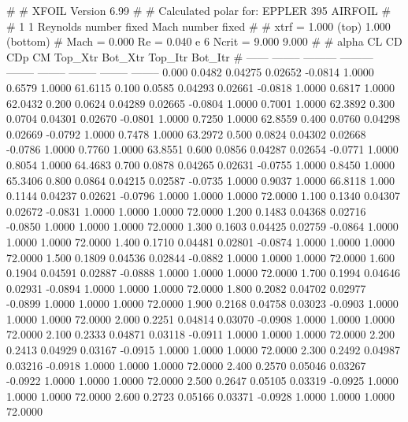#  
#       XFOIL         Version 6.99
#  
# Calculated polar for: EPPLER 395 AIRFOIL                              
#  
# 1 1 Reynolds number fixed          Mach number fixed         
#  
# xtrf =   1.000 (top)        1.000 (bottom)  
# Mach =   0.000     Re =     0.040 e 6     Ncrit =   9.000  9.000
#  
#   alpha    CL        CD       CDp       CM     Top_Xtr  Bot_Xtr  Top_Itr  Bot_Itr
#  ------ -------- --------- --------- -------- -------- -------- -------- --------
   0.000   0.0482   0.04275   0.02652  -0.0814   1.0000   0.6579   1.0000  61.6115
   0.100   0.0585   0.04293   0.02661  -0.0818   1.0000   0.6817   1.0000  62.0432
   0.200   0.0624   0.04289   0.02665  -0.0804   1.0000   0.7001   1.0000  62.3892
   0.300   0.0704   0.04301   0.02670  -0.0801   1.0000   0.7250   1.0000  62.8559
   0.400   0.0760   0.04298   0.02669  -0.0792   1.0000   0.7478   1.0000  63.2972
   0.500   0.0824   0.04302   0.02668  -0.0786   1.0000   0.7760   1.0000  63.8551
   0.600   0.0856   0.04287   0.02654  -0.0771   1.0000   0.8054   1.0000  64.4683
   0.700   0.0878   0.04265   0.02631  -0.0755   1.0000   0.8450   1.0000  65.3406
   0.800   0.0864   0.04215   0.02587  -0.0735   1.0000   0.9037   1.0000  66.8118
   1.000   0.1144   0.04237   0.02621  -0.0796   1.0000   1.0000   1.0000  72.0000
   1.100   0.1340   0.04307   0.02672  -0.0831   1.0000   1.0000   1.0000  72.0000
   1.200   0.1483   0.04368   0.02716  -0.0850   1.0000   1.0000   1.0000  72.0000
   1.300   0.1603   0.04425   0.02759  -0.0864   1.0000   1.0000   1.0000  72.0000
   1.400   0.1710   0.04481   0.02801  -0.0874   1.0000   1.0000   1.0000  72.0000
   1.500   0.1809   0.04536   0.02844  -0.0882   1.0000   1.0000   1.0000  72.0000
   1.600   0.1904   0.04591   0.02887  -0.0888   1.0000   1.0000   1.0000  72.0000
   1.700   0.1994   0.04646   0.02931  -0.0894   1.0000   1.0000   1.0000  72.0000
   1.800   0.2082   0.04702   0.02977  -0.0899   1.0000   1.0000   1.0000  72.0000
   1.900   0.2168   0.04758   0.03023  -0.0903   1.0000   1.0000   1.0000  72.0000
   2.000   0.2251   0.04814   0.03070  -0.0908   1.0000   1.0000   1.0000  72.0000
   2.100   0.2333   0.04871   0.03118  -0.0911   1.0000   1.0000   1.0000  72.0000
   2.200   0.2413   0.04929   0.03167  -0.0915   1.0000   1.0000   1.0000  72.0000
   2.300   0.2492   0.04987   0.03216  -0.0918   1.0000   1.0000   1.0000  72.0000
   2.400   0.2570   0.05046   0.03267  -0.0922   1.0000   1.0000   1.0000  72.0000
   2.500   0.2647   0.05105   0.03319  -0.0925   1.0000   1.0000   1.0000  72.0000
   2.600   0.2723   0.05166   0.03371  -0.0928   1.0000   1.0000   1.0000  72.0000
